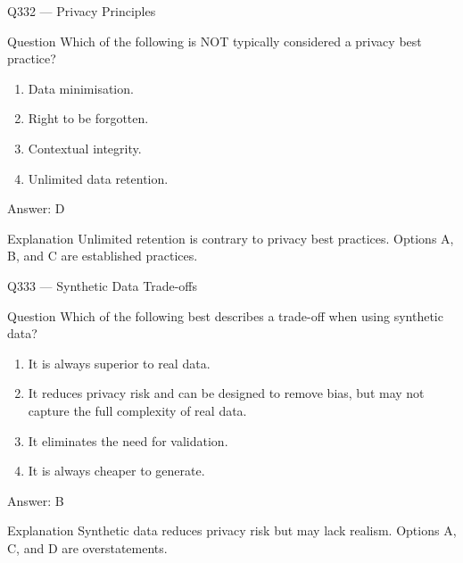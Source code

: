 \documentclass[aspectratio=169,8pt]{beamer}
\begin{document}
\begin{frame}{Q332 --- Privacy Principles}
	\begin{block}{Question}
		Which of the following is NOT typically considered a privacy best practice?
		\begin{enumerate}
			\item Data minimisation.
			\item Right to be forgotten.
			\item Contextual integrity.
			\item Unlimited data retention.
	\end{enumerate}  \end{block}
	\begin{exampleblock}{Answer: D}\end{exampleblock}
	\begin{block}{Explanation}
		Unlimited retention is contrary to privacy best practices. Options A, B, and C are established practices.
	\end{block}
\end{frame}

\begin{frame}{Q333 --- Synthetic Data Trade-offs}
	\begin{block}{Question}
		Which of the following best describes a trade-off when using synthetic data?
		\begin{enumerate}
			\item It is always superior to real data.
			\item It reduces privacy risk and can be designed to remove bias, but may not capture the full complexity of real data.
			\item It eliminates the need for validation.
			\item It is always cheaper to generate.
	\end{enumerate}  \end{block}
	\begin{exampleblock}{Answer: B}\end{exampleblock}
	\begin{block}{Explanation}
		Synthetic data reduces privacy risk but may lack realism. Options A, C, and D are overstatements.
	\end{block}
\end{frame}
\end{document}
